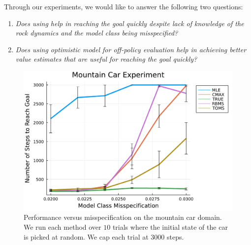 Through our experiments, we would like to answer the following two
questions:
\begin{enumerate}
\item \textit{Does using \taml{} help in reaching the goal quickly
    despite lack of knowledge of the rock dynamics and the model class
    being misspecified?}
\item \textit{Does using optimistic model for off-policy evaluation
    help in achieving better value estimates that are useful for
    reaching the goal quickly?}
\end{enumerate}

\begin{figure}[t]
  \centering
\includegraphics[width=0.6\linewidth]{figures/taml/mountain_car_online_model_search_all.pdf} 
  \caption{Performance versus misspecification on the mountain car
    domain. We run each method over $10$ trials where the initial
    state of the car is picked at random. We cap each trial at $3000$
    steps.}
  \label{fig:performance}
\end{figure}

